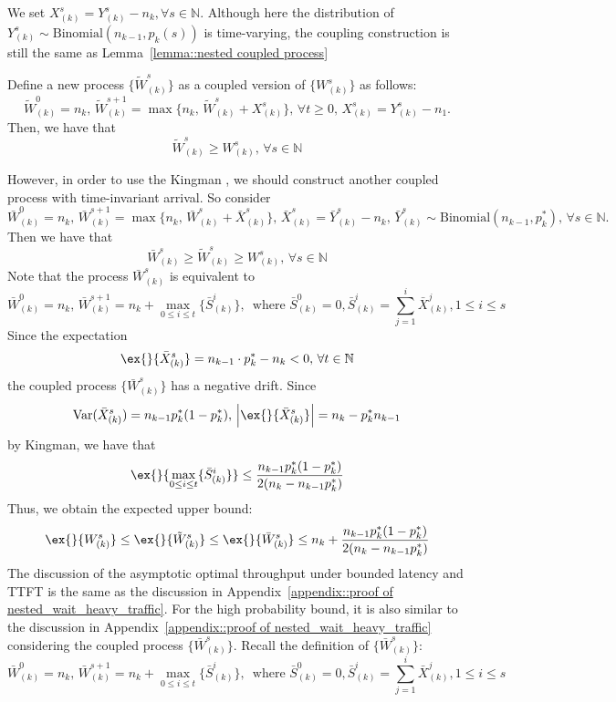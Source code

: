 We set $X_{(k)}^s  =  Y_{(k)}^s - n_k, \forall s\in \mathbb{N}$. Although here the distribution of $Y_{(k)}^s\sim \text{Binomial}(n_{k-1},p_k(s))$ is time-varying, the coupling construction is still the same as Lemma~\ref{lemma::nested coupled process}
\begin{lemma}\label{lemma: coupling, time varying}
Define a new process $\{ \tilde{W}_{(k)}^s\}$ as a coupled version of $\{  W_{(k)}^s \}$ as follows:
$$ \tilde{W}_{(k)}^0=n_k, \, \tilde{W}_{(k)}^{s+1} = \max\{ n_k, \, \tilde{W}_{(k)}^s+X_{(k)}^s\},\, \forall t\geq 0 ,\, X_{(k)}^s = Y_{(k)}^s - n_1. $$
Then, we have that 
$$ \tilde{W}^s_{(k)}\geq W^s_{(k)},\,\forall s\in \mathbb{N} $$
\end{lemma}
However, in order to use the Kingman , we should construct another coupled process with time-invariant arrival. So consider
$$\bar{W}_{(k)}^0=n_k,\, \bar{W}_{(k)}^{s+1} = \max\{ n_k,\, \bar{W}_{(k)}^{s}+\bar{X}_{(k)}^s \}, \,\bar{X}_{(k)}^s =\bar{Y}_{(k)}^s  -n_k, \, \bar{Y}_{(k)}^s \sim \text{Binomial}(n_{k-1}, p_k^*),\,\forall s\in \mathbb{N}.  $$
Then we have that 
$$\bar{W}^s_{(k)}\geq \tilde{W}^s_{(k)}\geq W^s_{(k)},\,\forall s\in \mathbb{N}$$
Note that the process $\bar{W}^s_{(k)}$ is equivalent to 
$$ \bar{W}_{(k)}^0 = n_k,\, \bar{W}_{(k)}^{s+1} = n_k + \max_{0\leq i\leq t}\{ \bar{S}_{(k)}^i \} ,\, \text{ where }\bar{S}_{(k)}^0=0, \bar{S}_{(k)}^i = \sum_{j=1}^i \bar{X}_{(k)}^{j}, 1\leq i\leq s $$
Since the expectation
$$ \ex{}{\bar{X}_{(k)}^s} = n_{k-1}\cdot p_{k}^* - n_k <0,\, \forall t\in \mathbb{N} $$
the coupled process $\{\bar{W}_{(k)}^s \}$ has a negative drift. Since 
$$\text{Var}(\bar{X}_{(k)}^s) = n_{k-1}p_k^*(1-p_k^*),\,\left|\ex{}{\bar{X}_{(k)}^s}\right|=n_k - p_k^* n_{k-1}$$
by Kingman, we have that
$$\ex{}{\max_{0\leq i\leq t}\{ \bar{S}_{(k)}^i \}  }\leq  \frac{  n_{k-1}p_k^*(1-p_k^*) }{ 2(n_k - n_{k-1}p_k^*)} $$
Thus, we obtain the expected upper bound:
$$\ex{}{W_{(k)}^s}\leq \ex{}{\tilde{W}_{(k)}^s}\leq \ex{}{\bar{W}_{(k)}^s} \leq n_k + \frac{  n_{k-1}p_k^*(1-p_k^*) }{ 2(n_k - n_{k-1}p_k^*)}$$
The discussion of the asymptotic optimal throughput under bounded latency and TTFT is the same as the discussion in Appendix~\ref{appendix::proof of nested_wait_heavy_traffic}. For the high probability bound, it is also similar to the discussion in Appendix~\ref{appendix::proof of nested_wait_heavy_traffic} considering the coupled process $\{ \bar{W}_{(k)}^s \}$. Recall the definition of $\{ \bar{W}_{(k)}^s \}$:
$$ \bar{W}_{(k)}^0 = n_k,\, \bar{W}_{(k)}^{s+1} = n_k + \max_{0\leq i\leq t}\{ \bar{S}_{(k)}^i \} ,\, \text{ where }\bar{S}_{(k)}^0=0, \bar{S}_{(k)}^i = \sum_{j=1}^i \bar{X}_{(k)}^{j}, 1\leq i\leq s $$
